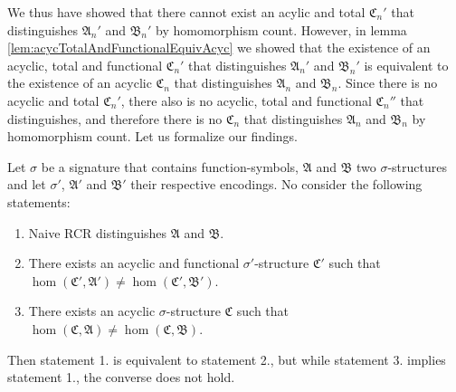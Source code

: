We thus have showed that there cannot exist an acylic and total $\mathfrak C_n'$ that distinguishes $\mathfrak A_n'$ and $\mathfrak B_n'$ by homomorphism count.
However, in lemma \ref{lem:acycTotalAndFunctionalEquivAcyc} we showed that the existence of an acyclic, total and functional $\mathfrak C_n'$ that distinguishes $\mathfrak A_n'$ and $\mathfrak B_n'$ is equivalent to the existence of an acyclic $\mathfrak C_n$ that distinguishes $\mathfrak A_n$ and $\mathfrak B_n$.
Since there is no acyclic and total $\mathfrak C_n'$, there also is no acyclic, total and functional $\mathfrak C_n''$ that distinguishes, and therefore there is no $\mathfrak C_n$ that distinguishes $\mathfrak A_n$ and $\mathfrak B_n$ by homomorphism count.
Let us formalize our findings.

\begin{theorem}
	Let $\sigma$ be a signature that contains function-symbols, $\mathfrak A$ and $\mathfrak B$ two $\sigma$-structures and let $\sigma'$, $\mathfrak A'$ and $\mathfrak B'$ their respective encodings.
	No consider the following statements:
	\begin{enumerate}
		\item Naive RCR distinguishes $\mathfrak A$ and $\mathfrak B$.
		\item There exists an acyclic and functional $\sigma'$-structure $\mathfrak C'$ such that $\hom(\mathfrak C',\mathfrak A')\neq\hom(\mathfrak C',\mathfrak B')$.
		\item There exists an acyclic $\sigma$-structure $\mathfrak C$ such that $\hom(\mathfrak C,\mathfrak A)\neq \hom(\mathfrak C,\mathfrak B)$.
	\end{enumerate}
	Then statement 1. is equivalent to statement 2., but while statement 3. implies statement 1., the converse does not hold.
	\label{thm:nRCRNotCharacByHomCount}
\end{theorem}
